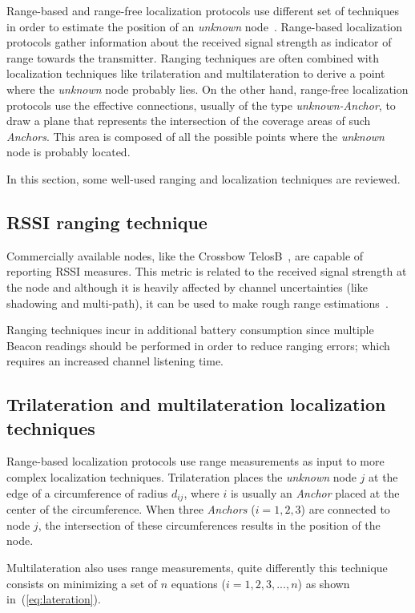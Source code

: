Range-based and range-free localization protocols use different set of techniques in order to estimate the position of an \emph{unknown} node~\cite{rang:loc:techniques}. Range-based localization protocols gather information about the received signal strength as indicator of range towards the transmitter. Ranging techniques are often combined with localization techniques like trilateration and multilateration to derive a point where the \emph{unknown} node probably lies. On the other hand, range-free localization protocols use the effective connections, usually of the type \emph{unknown-Anchor}, to draw a plane that represents the intersection of the coverage areas of such \emph{Anchors}. This area is composed of all the possible points where the \emph{unknown} node is probably located.

In this section, some well-used ranging and localization techniques are reviewed.

\subsection{RSSI ranging technique} \label{rssi}
Commercially available nodes, like the Crossbow TelosB~\cite{telosB}, are capable of reporting RSSI measures. This metric is related to the received signal strength at the node and although it is heavily affected by channel uncertainties (like shadowing and multi-path), it can be used to make rough range estimations~\cite{rang:loc:techniques}.

Ranging techniques incur in additional battery consumption since multiple Beacon readings should be performed in order to reduce ranging errors; which requires an increased channel listening time.

\subsection{Trilateration and multilateration localization techniques} \label{lateration}
Range-based localization protocols use range measurements as input to more complex localization techniques. Trilateration places the \emph{unknown} node $j$ at the edge of a circumference of radius $d_{ij}$, where $i$ is usually an \emph{Anchor} placed at the center of the circumference. When three \emph{Anchors} ($i=1,2,3$) are connected to node $j$, the intersection of these circumferences results in the position of the node.

Multilateration also uses range measurements, quite differently this technique consists on minimizing a set of $n$ equations ($i=1,2,3,...,n$) as shown in~(\ref{eq:lateration}).

